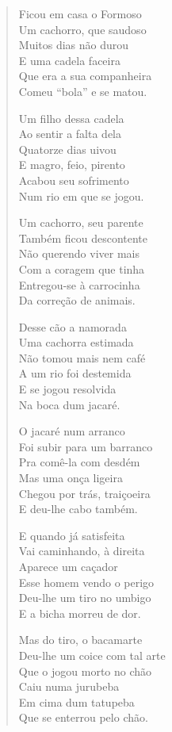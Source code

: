 \begin{verse}
Ficou em casa o Formoso\\
Um cachorro, que saudoso\\
Muitos dias não durou\\
E uma cadela faceira\\
Que era a sua companheira\\
Comeu “bola” e se matou.

Um filho dessa cadela\\
Ao sentir a falta dela\\
Quatorze dias uivou\\
E magro, feio, pirento\\
Acabou seu sofrimento\\
Num rio em que se jogou.

Um cachorro, seu parente\\
Também ficou descontente\\
Não querendo viver mais\\
Com a coragem que tinha\\
Entregou-se à carrocinha\\
Da correção de animais.

Desse cão a namorada\\
Uma cachorra estimada\\
Não tomou mais nem café\\
A um rio foi destemida\\
E se jogou resolvida\\
Na boca dum jacaré.


O jacaré num arranco\\
Foi subir para um barranco\\
Pra comê-la com desdém\\
Mas uma onça ligeira\\
Chegou por trás, traiçoeira\\
E deu-lhe cabo também.

E quando já satisfeita\\
Vai caminhando, à direita\\
Aparece um caçador\\
Esse homem vendo o perigo\\
Deu-lhe um tiro no umbigo\\
E a bicha morreu de dor.

Mas do tiro, o bacamarte\\
Deu-lhe um coice com tal arte\\
Que o jogou morto no chão\\
Caiu numa jurubeba\\
Em cima dum tatupeba\\
Que se enterrou pelo chão.


\end{verse}
